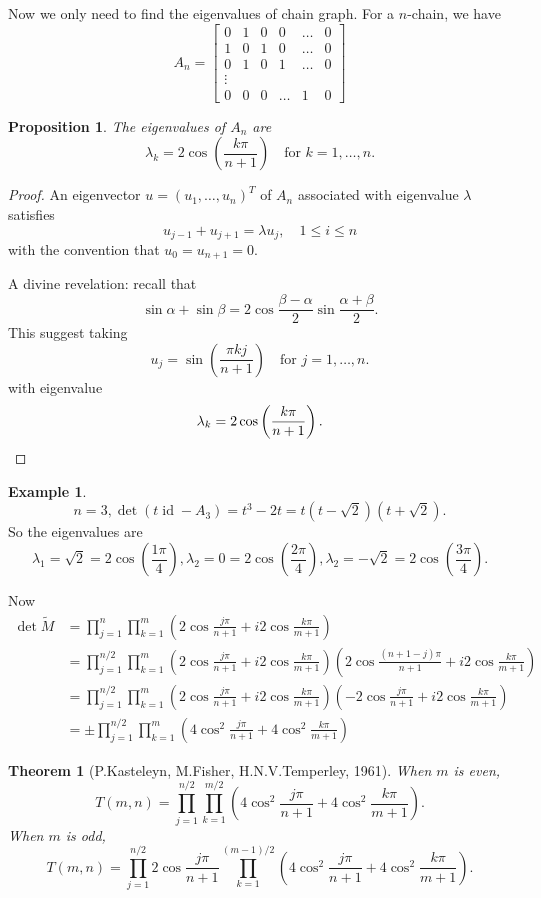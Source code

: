 \documentclass{report}
\def \id {\operatorname{id}}
\newtheorem{theorem}{Theorem}[section]
\newtheorem{proposition}{Proposition}[section]
\theoremstyle{definition}
\newtheorem{example}{Example}[section]
\theoremstyle{remark}
\numberwithin{equation}{section}
\begin{document}
Now we only need to find the eigenvalues of chain graph. For a $n$-chain, we have
\[
A_n = \begin{bmatrix}
0 & 1 & 0 & 0 & \ldots & 0 \\
1 & 0 & 1 & 0 & \ldots & 0 \\
0 & 1 & 0 & 1 & \ldots & 0 \\
\vdots \\
0 & 0 & 0 & \ldots & 1 & 0
\end{bmatrix}
\]
\begin{proposition}
The eigenvalues of $A_n$ are 
\[
\lambda_k = 2 \cos\left(\frac{k\pi}{n+1}\right)\quad \text{for } k = 1, \ldots, n.
\]
\end{proposition}
\begin{proof}
An eigenvector $u = (u_1, \ldots, u_n)^T$ of $A_n$ associated with eigenvalue $\lambda$ satisfies
\[
u_{j-1}+u_{j+1} = \lambda u_j, \quad 1 \leq i \leq n
\]
with the convention that $u_0 = u_{n+1} = 0$.


A divine revelation:
recall that \[\sin\alpha + \sin\beta = 2\cos\frac{\beta - \alpha}{2}\sin\frac{\alpha+\beta}{2}.\]
This suggest taking
\[
u_j = \sin\left(\frac{\pi k j}{n + 1}\right) \quad \text{for } j = 1, \ldots, n.
\]
with eigenvalue 
\[
\lambda_k = 2 \cos\left(\frac{k\pi}{n+1}\right). \qedhere
\]
\end{proof}
\begin{example}
\[n = 3, \det(t\id - A_3) = t^3 - 2t = t(t - \sqrt{2})(t + \sqrt{2}).\]
So the eigenvalues are 
\[
\lambda_1 = \sqrt{2} = 2\cos\left(\frac{1\pi}{4}\right), \lambda_2 = 0 = 2\cos\left(\frac{2\pi}{4}\right), \lambda_2 = -\sqrt{2} = 2\cos\left(\frac{3\pi}{4}\right).
\]
\end{example}
Now
\begin{align*}
\det\tilde{M} & = \prod_{j=1}^n\prod_{k=1}^m \left(2\cos\frac{j\pi}{n+1} + i2\cos\frac{k\pi}{m+1}\right) \\ & = \prod_{j=1}^{n/2}\prod_{k=1}^m \left(2\cos\frac{j\pi}{n+1} + i2\cos\frac{k\pi}{m+1}\right)\left(2\cos\frac{(n+1-j)\pi}{n+1} + i2\cos\frac{k\pi}{m+1}\right) \\
& = \prod_{j=1}^{n/2}\prod_{k=1}^m \left(2\cos\frac{j\pi}{n+1} + i2\cos\frac{k\pi}{m+1}\right)\left(-2\cos\frac{j\pi}{n+1} + i2\cos\frac{k\pi}{m+1}\right) \\
& = \pm\prod_{j=1}^{n/2}\prod_{k=1}^m \left(4\cos^2\frac{j\pi}{n+1} + 4\cos^2\frac{k\pi}{m+1}\right)
\end{align*}

\begin{theorem}[P.Kasteleyn, M.Fisher, H.N.V.Temperley, 1961]
When $m$ is even,
\[
T(m, n) = \prod_{j=1}^{n/2}\prod_{k=1}^{m/2} \left(4\cos^2\frac{j\pi}{n+1} + 4\cos^2\frac{k\pi}{m+1}\right).
\]
When $m$ is odd,
\[
T(m, n) = \prod_{j=1}^{n/2}2\cos\frac{j\pi}{n+1}\prod_{k=1}^{(m-1)/2} \left(4\cos^2\frac{j\pi}{n+1} + 4\cos^2\frac{k\pi}{m+1}\right).
\]
\end{theorem}
\end{document}
